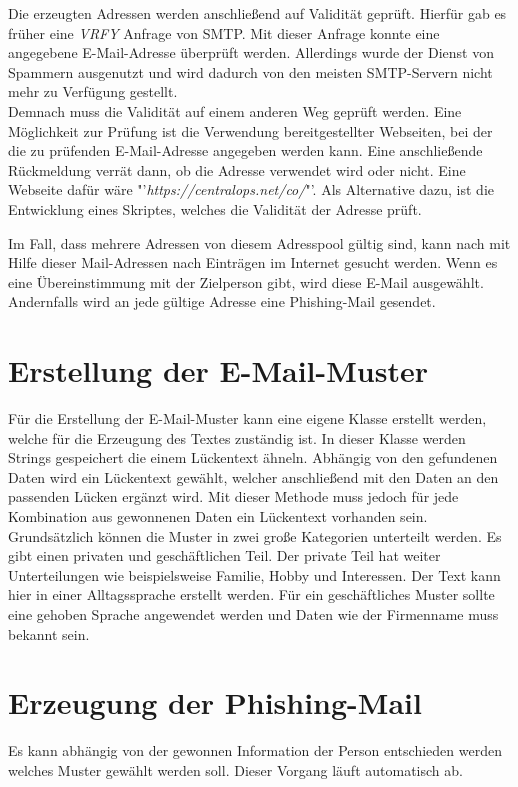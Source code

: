 Die erzeugten Adressen werden anschließend auf Validität geprüft. Hierfür gab es früher eine \textit{VRFY} Anfrage von SMTP. Mit dieser Anfrage konnte eine angegebene E-Mail-Adresse überprüft werden. Allerdings wurde der Dienst von Spammern ausgenutzt und wird dadurch von den meisten SMTP-Servern nicht mehr zu Verfügung gestellt.\cite{balduzzi2010abusing}\\
Demnach muss die Validität auf einem anderen Weg geprüft werden. Eine Möglichkeit zur Prüfung ist die Verwendung bereitgestellter Webseiten, bei der die zu prüfenden E-Mail-Adresse angegeben werden kann. Eine anschließende Rückmeldung verrät dann, ob die Adresse verwendet wird oder nicht. Eine Webseite dafür wäre "'\textit{https://centralops.net/co/}"'. Als Alternative dazu, ist die Entwicklung eines Skriptes, welches die Validität der Adresse prüft.

Im Fall, dass mehrere Adressen von diesem Adresspool gültig sind, kann nach mit Hilfe dieser Mail-Adressen nach Einträgen im Internet gesucht werden. Wenn es eine Übereinstimmung mit der Zielperson gibt, wird diese E-Mail ausgewählt. Andernfalls wird an jede gültige Adresse eine Phishing-Mail gesendet. 

\section{Erstellung der E-Mail-Muster}
Für die Erstellung der E-Mail-Muster kann eine eigene Klasse erstellt werden, welche für die Erzeugung des Textes zuständig ist. In dieser Klasse werden Strings gespeichert die einem Lückentext ähneln. Abhängig von den gefundenen Daten wird ein Lückentext gewählt, welcher anschließend mit den Daten an den passenden Lücken ergänzt wird. Mit dieser Methode muss jedoch für jede Kombination aus gewonnenen Daten ein Lückentext vorhanden sein.\\
Grundsätzlich können die Muster in zwei große Kategorien unterteilt werden. Es gibt einen privaten und geschäftlichen Teil. Der private Teil hat weiter Unterteilungen wie beispielsweise Familie, Hobby und Interessen. Der Text kann hier in einer Alltagssprache erstellt werden. Für ein geschäftliches Muster sollte eine gehoben Sprache angewendet werden und Daten wie der Firmenname muss bekannt sein. 

\section{Erzeugung der Phishing-Mail}
Es kann abhängig von der gewonnen Information der Person entschieden werden welches Muster gewählt werden soll. Dieser Vorgang läuft automatisch ab.